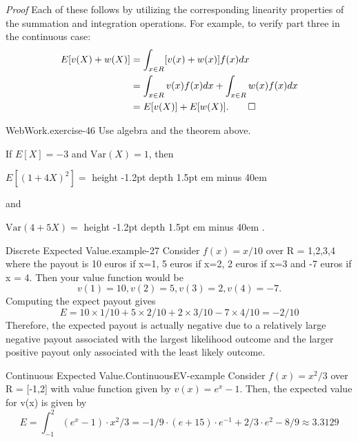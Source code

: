 \documentclass[10pt,]{book}
\makeatletter
\newcommand{\fillin}[1]{\leavevmode\leaders\vrule height -1.2pt depth 1.5pt \hskip #1em minus #1em \null}
\renewcommand*{\proofname}{Proof}
\renewenvironment{proof}[1][\proofname]{\par
  \pushQED{\qed}%
  \normalfont \topsep6\p@\@plus6\p@\relax
  \trivlist
  \item\relax
    {\itshape
    #1\@addpunct{.}}\hspace\labelsep\ignorespaces
}{%
  \popQED\endtrivlist\@endpefalse
}
\numberwithin{equation}{section}
\makeatother
\begin{document}
\begin{proof}\hypertarget{proof-31}{}
\hypertarget{p-719}{}%
Each of these follows by utilizing the corresponding linearity properties of the summation and integration operations. For example, to verify part three in the continuous case:%
\begin{align*}
E[v(X) + w(X)] & = \int_{x \in R} [v(x)+w(x)]f(x) dx\\
& = \int_{x \in R} v(x)f(x) dx + \int_{x \in R} w(x)f(x) dx\\
& = E[v(X)] + E[w(X)].\qedhere
\end{align*}
%
\end{proof}
%
\par
\hypertarget{p-720}{}%
\begin{inlineexercise}{WebWork.}{exercise-46}%
\hypertarget{p-721}{}%
Use algebra and the theorem above.%
\par\medskip
\hypertarget{p-722}{}%
If \(E[X]=-3\) and \(\mbox{Var}(X) = 1\), then%
\par
\hypertarget{p-723}{}%
\(E[(1 + 4 X)^2] =\) \fillin{40}%
\par
\hypertarget{p-724}{}%
and%
\par
\hypertarget{p-725}{}%
\(\mbox{Var}(4 + 5 X) =\) \fillin{40}.%
\end{inlineexercise}
%
\par
\hypertarget{p-726}{}%
\begin{example}{Discrete Expected Value.}{example-27}%
\hypertarget{p-727}{}%
Consider \(f(x) = x/10\) over R = {1,2,3,4} where the payout is 10 euros if x=1, 5 euros if x=2, 2 euros if x=3 and -7 euros if x = 4.  Then your value function would be%
\begin{equation*}
v(1)=10, v(2) = 5, v(3)=2, v(4) = -7.
\end{equation*}
Computing the expect payout gives%
\begin{equation*}
E = 10 \times 1/10 + 5 \times 2/10 + 2 \times 3/10 - 7 \times 4/10 = -2/10
\end{equation*}
Therefore, the expected payout is actually negative due to a relatively large negative payout associated with the largest likelihood outcome and the larger positive payout only associated with the least likely outcome.%
\end{example}
%
\par
\hypertarget{p-728}{}%
\begin{example}{Continuous Expected Value.}{ContinuousEV-example}%
\hypertarget{p-729}{}%
Consider \(f(x) = x^2/3\) over R = [-1,2] with value function given by \(v(x) = e^x - 1\). Then, the expected value for v(x) is given by%
\begin{equation*}
E = \int_{-1}^2 (e^x-1) \cdot x^2/3 = -1/9 \cdot (e + 15) \cdot e^{-1} + 2/3 \cdot e^2 - 8/9 \approx 3.3129
\end{equation*}
%
\end{example}
\end{document}
